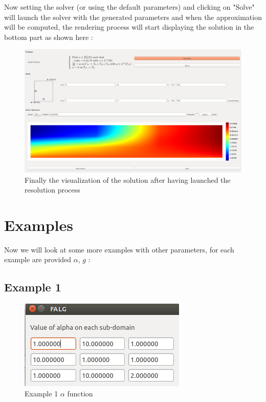 \documentclass[a4paper]{report}
\begin{document}
Now setting the solver (or using the default parameters) and clicking on "Solve" will launch the solver with the generated parameters and when the approximation will be computed, the rendering process will start displaying the solution in the bottom part as shown here :
\begin{figure}[H]
\begin{center}
\includegraphics[scale=0.20]{fem_main_example.png}\caption{Finally the visualization of the solution after having launched the resolution process}
\end{center}
\end{figure}
\newpage
\section{Examples}
Now we will look at some more examples with other parameters, for each example are provided $\alpha$, $g$ :
\subsection{Example 1}
\begin{figure}[H]
\begin{center}
\includegraphics[scale=0.50]{example_1_alpha.png}\caption{Example 1 $\alpha$ function}
\end{center}
\end{figure}
\end{document}
